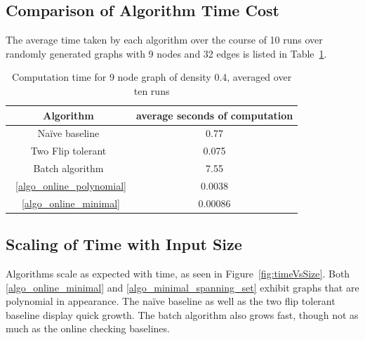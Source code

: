 \documentclass[sigplan,review,anonymous]{acmart}
\begin{document}
{\subsection{Comparison of Algorithm Time Cost}
The average time taken by each algorithm over the course of 10 runs over randomly generated graphs with 9 nodes and 32 edges is listed in Table~\ref{tab:times}.

\begin{table}
\begin{tabular}{|c|c|}
    \hline
    Algorithm & average seconds of computation \\
    \hline
    Na\"{i}ve baseline & 0.77 \\
    Two Flip tolerant & 0.075 \\
    Batch algorithm & 7.55 \\
    ~\ref{algo_online_polynomial} & 0.0038 \\
    ~\ref{algo_online_minimal} & 0.00086 \\
    \hline
\end{tabular}
\caption{Computation time for 9 node graph of density 0.4, averaged over ten runs}
\label{tab:times} %
\end{table}
    
\subsection{Scaling of Time with Input Size}


Algorithms scale as expected with time, as seen in Figure~\ref{fig:timeVsSize}.
Both \ref{algo_online_minimal} and \ref{algo_minimal_spanning_set} exhibit graphs that are polynomial in appearance.
The na\"{i}ve baseline as well as the two flip tolerant baseline display quick growth.
The batch algorithm also grows fast, though not as much as the online checking baselines.

}
\end{document}
